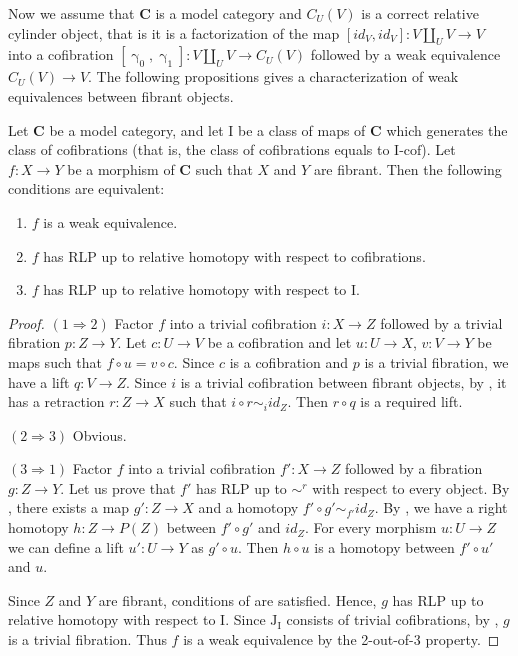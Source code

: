 \documentclass{tac}
\theoremstyle{definition}
\newcommand{\cat}[1]{\mathbf{#1}}
\newcommand{\C}{\cat{C}}
\newcommand{\I}{\mathrm{I}}
\newcommand{\J}{\mathrm{J}}
\newcommand{\class}[2]{#1\text{-}\mathrm{#2}}
\newcommand{\Icof}[1][\I]{\class{#1}{cof}}
\newcommand{\cyli}{\upgamma}
\begin{document}
Now we assume that $\C$ is a model category and $C_U(V)$ is a correct relative cylinder object, that is it is a factorization of the map $[id_V,id_V] : V \amalg_U V \to V$
into a cofibration $[\cyli_0,\cyli_1] : V \amalg_U V \to C_U(V)$ followed by a weak equivalence $C_U(V) \to V$.
The following propositions gives a characterization of weak equivalences between fibrant objects.

\begin{prop}[min-we]
Let $\C$ be a model category, and let $\I$ be a class of maps of $\C$ which generates the class of cofibrations (that is, the class of cofibrations equals to $\Icof$).
Let $f : X \to Y$ be a morphism of $\C$ such that $X$ and $Y$ are fibrant.
Then the following conditions are equivalent:
\begin{enumerate}
\item $f$ is a weak equivalence.
\item $f$ has RLP up to relative homotopy with respect to cofibrations.
\item $f$ has RLP up to relative homotopy with respect to $\I$.
\end{enumerate}
\end{prop}
\begin{proof}
$(1 \Rightarrow 2)$
Factor $f$ into a trivial cofibration $i : X \to Z$ followed by a trivial fibration $p : Z \to Y$.
Let $c : U \to V$ be a cofibration and let $u : U \to X$, $v : V \to Y$ be maps such that $f \circ u = v \circ c$.
Since $c$ is a cofibration and $p$ is a trivial fibration, we have a lift $q : V \to Z$.
Since $i$ is a trivial cofibration between fibrant objects, by , it has a retraction $r : Z \to X$ such that $i \circ r \sim_i id_Z$.
Then $r \circ q$ is a required lift.

$(2 \Rightarrow 3)$ Obvious.

$(3 \Rightarrow 1)$
Factor $f$ into a trivial cofibration $f' : X \to Z$ followed by a fibration $g : Z \to Y$.
Let us prove that $f'$ has RLP up to $\sim^r$ with respect to every object.
By , there exists a map $g' : Z \to X$ and a homotopy $f' \circ g' \sim_{f'} id_Z$.
By , we have a right homotopy $h : Z \to P(Z)$ between $f' \circ g'$ and $id_Z$.
For every morphism $u : U \to Z$ we can define a lift $u' : U \to Y$ as $g' \circ u$.
Then $h \circ u$ is a homotopy between $f' \circ u'$ and $u$.

Since $Z$ and $Y$ are fibrant, conditions of  are satisfied.
Hence, $g$ has RLP up to relative homotopy with respect to $\I$.
Since $\J_\I$ consists of trivial cofibrations, by , $g$ is a trivial fibration.
Thus $f$ is a weak equivalence by the 2-out-of-3 property.
\end{proof}
\end{document}
